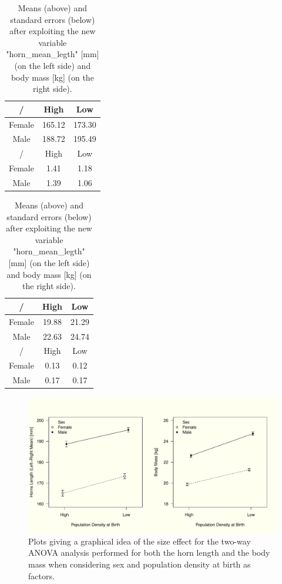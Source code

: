 \documentclass{article}
\begin{document}
\begin{table}[!htb]
    \caption{Means (above) and standard errors (below) after exploiting the new variable "horn\_mean\_legth" [mm] (on the left side) and body mass [kg] (on the right side).}
    \label{tab:A}
    \begin{minipage}{.5\linewidth}
      \centering
        \begin{tabular}{c c c} 
 \hline
/ & High & Low   \\  
 \hline
 Female &165.12& 173.30\\
 Male &188.72& 195.49  \\
 \hline
 \hline
/ & High & Low   \\  
 \hline
 Female &1.41&1.18 \\
 Male &1.39& 1.06 \\
 \hline
\end{tabular}
    \end{minipage}%
    \begin{minipage}{.5\linewidth}
      \centering
\begin{tabular}{c c c} 
 \hline
/ & High & Low   \\  
 \hline
 Female &19.88&21.29 \\
 Male &22.63&24.74  \\
 \hline
 \hline
/ & High & Low   \\  
 \hline
 Female &0.13&0.12 \\
 Male &0.17&0.17  \\
 \hline
\end{tabular}
    \end{minipage} 
\end{table}
\begin{figure}[H]
\centering
  \includegraphics[scale=0.5]{anova2.pdf}
\caption{Plots giving a graphical idea of the size effect for the two-way ANOVA analysis performed for both the horn length and the body mass when considering sex and population density at birth as factors.}
  \label{fig:aov1}
\end{figure}
\end{document}
